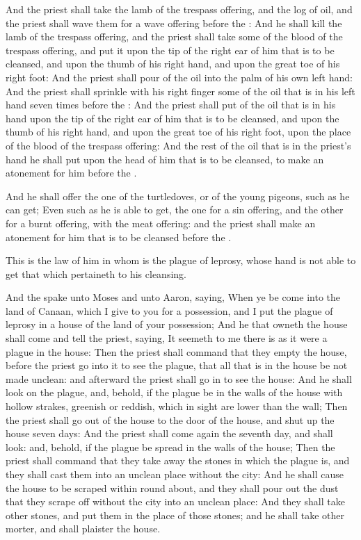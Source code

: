 \Verse And the priest shall take the lamb of the trespass offering, and the log of oil, and the priest shall wave them for a wave offering before the \LORD: \Verse And he shall kill the lamb of the trespass offering, and the priest shall take some of the blood of the trespass offering, and put it upon the tip of the right ear of him that is to be cleansed, and upon the thumb of his right hand, and upon the great toe of his right foot: \Verse And the priest shall pour of the oil into the palm of his own left hand: \Verse And the priest shall sprinkle with his right finger some of the oil that is in his left hand seven times before the \LORD: \Verse And the priest shall put of the oil that is in his hand upon the tip of the right ear of him that is to be cleansed, and upon the thumb of his right hand, and upon the great toe of his right foot, upon the place of the blood of the trespass offering: \Verse And the rest of the oil that is in the priest's hand he shall put upon the head of him that is to be cleansed, to make an atonement for him before the \LORD.

\Verse And he shall offer the one of the turtledoves, or of the young pigeons, such as he can get; \Verse Even such as he is able to get, the one for a sin offering, and the other for a burnt offering, with the meat offering: and the priest shall make an atonement for him that is to be cleansed before the \LORD.

\Verse This is the law of him in whom is the plague of leprosy, whose hand is not able to get that which pertaineth to his cleansing.

\Verse And the \LORD spake unto Moses and unto Aaron, saying, \Verse When ye be come into the land of Canaan, which I give to you for a possession, and I put the plague of leprosy in a house of the land of your possession; \Verse And he that owneth the house shall come and tell the priest, saying, It seemeth to me there is as it were a plague in the house: \Verse Then the priest shall command that they empty the house, before the priest go into it to see the plague, that all that is in the house be not made unclean: and afterward the priest shall go in to see the house: \Verse And he shall look on the plague, and, behold, if the plague be in the walls of the house with hollow strakes, greenish or reddish, which in sight are lower than the wall; \Verse Then the priest shall go out of the house to the door of the house, and shut up the house seven days: \Verse And the priest shall come again the seventh day, and shall look: and, behold, if the plague be spread in the walls of the house; \Verse Then the priest shall command that they take away the stones in which the plague is, and they shall cast them into an unclean place without the city: \Verse And he shall cause the house to be scraped within round about, and they shall pour out the dust that they scrape off without the city into an unclean place: \Verse And they shall take other stones, and put them in the place of those stones; and he shall take other morter, and shall plaister the house.

